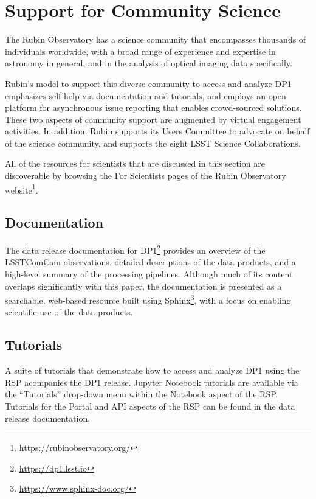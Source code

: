 \section{Support for Community Science}
\label{sec:community_science}

The Rubin Observatory has a science community that encompasses thousands of individuals worldwide, with a broad range of experience and expertise in astronomy in general, and in the analysis of optical imaging data specifically.

Rubin's model to support this diverse community to access and analyze \gls{DP1} emphasizes self-help via documentation and tutorials, and employs an open platform for asynchronous issue reporting that enables crowd-sourced solutions.
These two aspects of community support are augmented by virtual engagement activities.
In addition, Rubin supports its Users Committee to advocate on behalf of the science community, and supports the eight \gls{LSST} Science Collaborations.

All of the resources for scientists that are discussed in this section are discoverable by browsing the For Scientists pages of the Rubin Observatory website\footnote{\url{https://rubinobservatory.org/}}.

\subsection{Documentation}
\label{ssec:documentation}

The data release documentation for DP1\footnote{\url{https://dp1.lsst.io}} provides an overview of the LSSTComCam observations, detailed descriptions of the data products, and a high-level summary of the processing pipelines. 
Although much of its content overlaps significantly with this paper, the documentation is presented as a searchable, web-based resource built using Sphinx\footnote{\url{https://www.sphinx-doc.org/}}, with a focus on enabling scientific use of the data products.

\subsection{Tutorials}
\label{ssec:tutorials}

A suite of tutorials that demonstrate how to access and analyze \gls{DP1} using the RSP acompanies the DP1 release.
Jupyter Notebook tutorials are available via the ``Tutorials'' drop-down menu within the Notebook aspect of the \gls{RSP}.
Tutorials for the Portal and API aspects of the \gls{RSP} can be found in the data release documentation.

